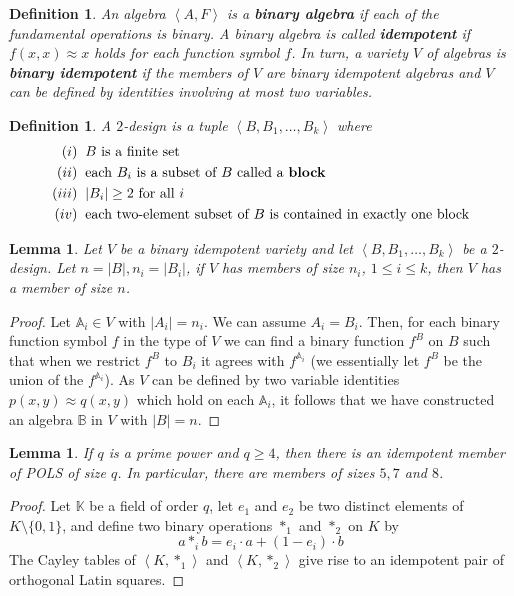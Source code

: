 \documentclass[12pt,a4paper]{article}
\newtheorem{lemma}[theorem]{Lemma}
\newtheorem{definition}[theorem]{Definition}
\begin{document}
\begin{definition}
    An algebra $\left<A,F\right>$ is a \textbf{binary algebra} if each of the fundamental operations is binary. A binary algebra is called \textbf{idempotent} if $f(x,x)\approx x$ holds for each function symbol $f$.
    In turn, a variety $V$ of algebras is \textbf{binary idempotent} if the members of $V$ are binary idempotent algebras and $V$ can be defined by identities involving at most two variables.
\end{definition}

\begin{definition}
    A $2$-design is a tuple $\left<B,B_1,\ldots,B_k\right>$ where
    \begin{align*}
        (i)\;\; & B \text{ is a finite set}\\
        (ii) \;\;& \text{each } B_i \text{ is a subset of } B \text{ called a \textbf{block}}\\
        (iii) \;\;& |B_i|\ge 2 \text{ for all } i\\
        (iv) \;\;& \text{each two-element subset of } B \text{ is contained in exactly one block}
    \end{align*}
\end{definition}

\begin{lemma}
Let $V$ be a binary idempotent variety and let $\left<B,B_1,\ldots,B_k\right>$ be a $2$-design.
Let $n=|B|, n_i=|B_i|$, if $V$ has members of size $n_i$, $1\le i\le k$, then $V$ has a member of size $n$.
\end{lemma}

\begin{proof}
Let $\mathbb{A}_i\in V$ with $|A_i|=n_i$. 
We can assume $A_i=B_i$. 
Then, for each binary function symbol $f$ in the type of $V$ we can find a binary function $f^B$ on $B$ such that when we restrict $f^B$ to $B_i$ it agrees with $f^{\mathbb{A}_i}$ (we essentially let $f^B$ be the union of the $f^{\mathbb{A}_i}$). 
As $V$ can be defined by two variable identities $p(x,y)\approx q(x,y)$ which hold on each $\mathbb{A}_i$, it follows that we have constructed an algebra $\mathbb{B}$ in $V$ with $|B|=n$.
\end{proof}

\begin{lemma}
If $q$ is a prime power and $q\ge 4$, then there is an idempotent member of POLS of size $q$.
In particular, there are members of sizes $5, 7$ and $8$.
\end{lemma}
\begin{proof}
Let $\mathbb{K}$ be a field of order $q$, let $e_1$ and $e_2$ be two distinct elements of $K\setminus\{0,1\}$, and define two binary operations $*_1$ and $*_2$ on $K$ by 
\[
a*_i b=e_i\cdot a+(1-e_i)\cdot b
\]
The Cayley tables of $\left<K,*_1\right>$ and $\left<K,*_2\right>$ give rise to an idempotent pair of orthogonal Latin squares.
\end{proof}
\end{document}
